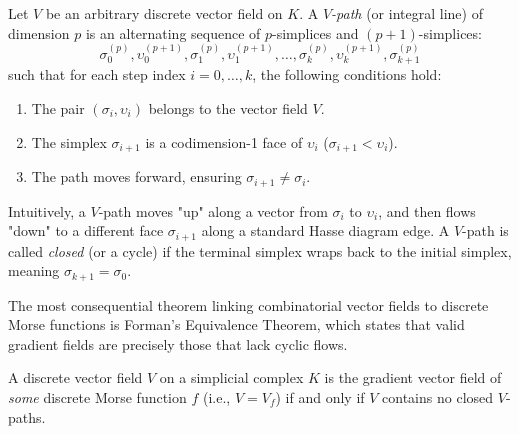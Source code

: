 \begin{definition}
Let $V$ be an arbitrary discrete vector field on $K$. A \emph{$V$-path} (or integral line) of dimension $p$ is an alternating sequence of $p$-simplices and $(p+1)$-simplices:
\[ \sigma_0^{(p)}, \upsilon_0^{(p+1)}, \sigma_1^{(p)}, \upsilon_1^{(p+1)}, \dots, \sigma_k^{(p)}, \upsilon_k^{(p+1)}, \sigma_{k+1}^{(p)} \]
such that for each step index $i = 0, \dots, k$, the following conditions hold:
\begin{enumerate}
    \item The pair $(\sigma_i, \upsilon_i)$ belongs to the vector field $V$.
    \item The simplex $\sigma_{i+1}$ is a codimension-1 face of $\upsilon_i$ ($\sigma_{i+1} < \upsilon_i$).
    \item The path moves forward, ensuring $\sigma_{i+1} \neq \sigma_i$.
\end{enumerate}
Intuitively, a $V$-path moves "up" along a vector from $\sigma_i$ to $\upsilon_i$, and then flows "down" to a different face $\sigma_{i+1}$ along a standard Hasse diagram edge.
A $V$-path is called \emph{closed} (or a cycle) if the terminal simplex wraps back to the initial simplex, meaning $\sigma_{k+1} = \sigma_0$.
\end{definition}

The most consequential theorem linking combinatorial vector fields to discrete Morse functions is Forman's Equivalence Theorem, which states that valid gradient fields are precisely those that lack cyclic flows.

\begin{theorem}
\label{thm:gradient_no_closed_paths}
A discrete vector field $V$ on a simplicial complex $K$ is the gradient vector field of \emph{some} discrete Morse function $f$ (i.e., $V = V_f$) if and only if $V$ contains no closed $V$-paths. 
\end{theorem}

